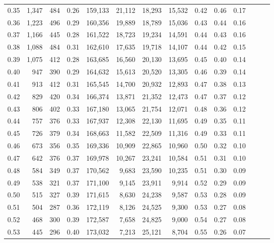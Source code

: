 \begin{tabular}{rrrrrrrrrrrrrr}
0.35 &   1,347 &  484 &  0.26 &  159,133 &   21,112 &  18,293 &  15,532 &  0.42 &  0.46 &      0.17 \\
0.36 &   1,223 &  496 &  0.29 &  160,356 &   19,889 &  18,789 &  15,036 &  0.43 &  0.44 &      0.16 \\
0.37 &   1,166 &  445 &  0.28 &  161,522 &   18,723 &  19,234 &  14,591 &  0.44 &  0.43 &      0.16 \\
0.38 &   1,088 &  484 &  0.31 &  162,610 &   17,635 &  19,718 &  14,107 &  0.44 &  0.42 &      0.15 \\
0.39 &   1,075 &  412 &  0.28 &  163,685 &   16,560 &  20,130 &  13,695 &  0.45 &  0.40 &      0.14 \\
0.40 &     947 &  390 &  0.29 &  164,632 &   15,613 &  20,520 &  13,305 &  0.46 &  0.39 &      0.14 \\
0.41 &     913 &  412 &  0.31 &  165,545 &   14,700 &  20,932 &  12,893 &  0.47 &  0.38 &      0.13 \\
0.42 &     829 &  420 &  0.34 &  166,374 &   13,871 &  21,352 &  12,473 &  0.47 &  0.37 &      0.12 \\
0.43 &     806 &  402 &  0.33 &  167,180 &   13,065 &  21,754 &  12,071 &  0.48 &  0.36 &      0.12 \\
0.44 &     757 &  376 &  0.33 &  167,937 &   12,308 &  22,130 &  11,695 &  0.49 &  0.35 &      0.11 \\
0.45 &     726 &  379 &  0.34 &  168,663 &   11,582 &  22,509 &  11,316 &  0.49 &  0.33 &      0.11 \\
0.46 &     673 &  356 &  0.35 &  169,336 &   10,909 &  22,865 &  10,960 &  0.50 &  0.32 &      0.10 \\
0.47 &     642 &  376 &  0.37 &  169,978 &   10,267 &  23,241 &  10,584 &  0.51 &  0.31 &      0.10 \\
0.48 &     584 &  349 &  0.37 &  170,562 &    9,683 &  23,590 &  10,235 &  0.51 &  0.30 &      0.09 \\
0.49 &     538 &  321 &  0.37 &  171,100 &    9,145 &  23,911 &   9,914 &  0.52 &  0.29 &      0.09 \\
0.50 &     515 &  327 &  0.39 &  171,615 &    8,630 &  24,238 &   9,587 &  0.53 &  0.28 &      0.09 \\
0.51 &     504 &  287 &  0.36 &  172,119 &    8,126 &  24,525 &   9,300 &  0.53 &  0.27 &      0.08 \\
0.52 &     468 &  300 &  0.39 &  172,587 &    7,658 &  24,825 &   9,000 &  0.54 &  0.27 &      0.08 \\
0.53 &     445 &  296 &  0.40 &  173,032 &    7,213 &  25,121 &   8,704 &  0.55 &  0.26 &      0.07 \\

\end{tabular}

